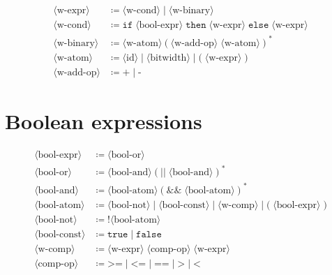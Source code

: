 \documentclass[letterpaper]{article}
\begin{document}
\begin{align*}
\langle\text{w-expr}\rangle
  &\coloneqq \langle\text{w-cond}\rangle \mid \langle\text{w-binary}\rangle \\
\langle\text{w-cond}\rangle
  &\coloneqq \texttt{if}\;\langle\text{bool-expr}\rangle\;\texttt{then}\;
      \langle\text{w-expr}\rangle\;\texttt{else}\;\langle\text{w-expr}\rangle \\
\langle\text{w-binary}\rangle
  &\coloneqq \langle\text{w-atom}\rangle
      (\langle\text{w-add-op}\rangle\;\langle\text{w-atom}\rangle)^* \\
\langle\text{w-atom}\rangle
  &\coloneqq \langle\text{id}\rangle \mid \langle\text{bitwidth}\rangle
      \mid \texttt{(}\;\langle\text{w-expr}\rangle\;\texttt{)} \\
\langle\text{w-add-op}\rangle
  &\coloneqq \texttt{+} \mid \texttt{-}
\end{align*}

\section*{Boolean expressions}

\begin{align*}
\langle\text{bool-expr}\rangle
  &\coloneqq \langle\text{bool-or}\rangle \\
\langle\text{bool-or}\rangle
  &\coloneqq \langle\text{bool-and}\rangle
      (\texttt{||}\;\langle\text{bool-and}\rangle)^* \\
\langle\text{bool-and}\rangle
  &\coloneqq \langle\text{bool-atom}\rangle
      (\texttt{\&\&}\;\langle\text{bool-atom}\rangle)^* \\
\langle\text{bool-atom}\rangle
  &\coloneqq \langle\text{bool-not}\rangle \mid \langle\text{bool-const}\rangle
      \mid \langle\text{w-comp}\rangle
      \mid \texttt{(}\;\langle\text{bool-expr}\rangle\;\texttt{)} \\
\langle\text{bool-not}\rangle
  &\coloneqq \texttt{!}\langle\text{bool-atom}\rangle \\
\langle\text{bool-const}\rangle
  &\coloneqq \texttt{true} \mid \texttt{false} \\
\langle\text{w-comp}\rangle
  &\coloneqq \langle\text{w-expr}\rangle\;\langle\text{comp-op}\rangle\;
      \langle\text{w-expr}\rangle \\
\langle\text{comp-op}\rangle
  &\coloneqq \texttt{>=} \mid \texttt{<=} \mid \texttt{==}
      \mid \texttt{>} \mid \texttt{<}
\end{align*}
\end{document}
